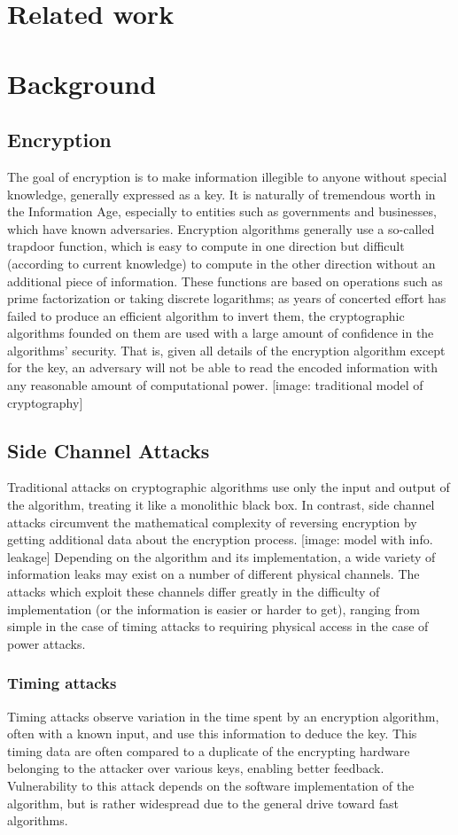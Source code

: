 \documentclass[times, 10pt,twocolumn]{article}
\begin{document}
\section{Related work}

\section{Background}
\subsection{Encryption}
The goal of encryption is to make information illegible to anyone without special knowledge, generally expressed as a key.  It is naturally of tremendous worth in the Information Age, especially to entities such as governments and businesses, which have known adversaries.  Encryption algorithms generally use a so-called trapdoor function, which is easy to compute in one direction but difficult (according to current knowledge) to compute in the other direction without an additional piece of information.  These functions are based on operations such as prime factorization or taking discrete logarithms; as years of concerted effort has failed to produce an efficient algorithm to invert them, the cryptographic algorithms founded on them are used with a large amount of confidence in the algorithms' security.  That is, given all details of the encryption algorithm except for the key, an adversary will not be able to read the encoded information with any reasonable amount of computational power.  [image: traditional model of cryptography]
\subsection{Side Channel Attacks}
Traditional attacks on cryptographic algorithms use only the input and output of the algorithm, treating it like a monolithic black box.  In contrast, side channel attacks circumvent the mathematical complexity of reversing encryption by getting additional data about the encryption process.  [image: model with info. leakage]  Depending on the algorithm and its implementation, a wide variety of information leaks may exist on a number of different physical channels.  The attacks which exploit these channels differ greatly in the difficulty of implementation (or the information is easier or harder to get), ranging from simple in the case of timing attacks to requiring physical access in the case of power attacks.
\subsubsection{Timing attacks}
Timing attacks observe variation in the time spent by an encryption algorithm, often with a known input, and use this information to deduce the key.  This timing data are often compared to a duplicate of the encrypting hardware belonging to the attacker over various keys, enabling better feedback.  Vulnerability to this attack depends on the software implementation of the algorithm, but is rather widespread due to the general drive toward fast algorithms.
\end{document}
